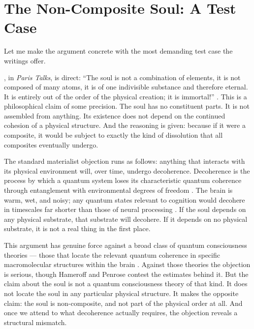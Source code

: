 \section{The Non-Composite Soul: A Test Case}
\label{sec:non-composite-soul}

Let me make the argument concrete with the most demanding test case the
\bahai writings offer.

\AbdulBaha, in \textit{Paris Talks}, is direct: ``The soul is not a
combination of elements, it is not composed of many atoms, it is of one
indivisible substance and therefore eternal. It is entirely out of the
order of the physical creation; it is immortal!''
\citep[p.~91]{ParisTalks}. This is a philosophical claim of some
precision. The soul has no constituent parts. It is not assembled from anything.
Its existence does not depend on the continued cohesion of a physical
structure. And the reasoning is given: because if it were a composite, it would
be subject to exactly the kind of dissolution that all composites eventually
undergo.

The standard materialist objection runs as follows: anything that interacts
with its physical environment will, over time, undergo decoherence. Decoherence
is the process by which a quantum system loses its characteristic quantum
coherence through entanglement with environmental degrees of freedom
\citep{Zurek2003}. The brain is warm, wet, and noisy; any quantum states
relevant to cognition would decohere in timescales far shorter than those of
neural processing \citep{Tegmark2000}. If the soul depends on any physical
substrate, that substrate will decohere. If it depends on no physical
substrate, it is not a real thing in the first place.

This argument has genuine force against a broad class of quantum consciousness
theories --- those that locate the relevant quantum coherence in specific
macromolecular structures within the brain \citep{HameroffPenrose2014}.
Against those theories the objection is serious, though Hameroff and Penrose
contest the estimates behind it. But the \bahai claim about the soul is not a quantum
consciousness theory of that kind. It does not locate the soul in any
particular physical structure. It makes the opposite claim: the soul is
non-composite, and not part of the physical order at all. And once we attend to
what decoherence actually requires, the objection reveals a structural mismatch.

